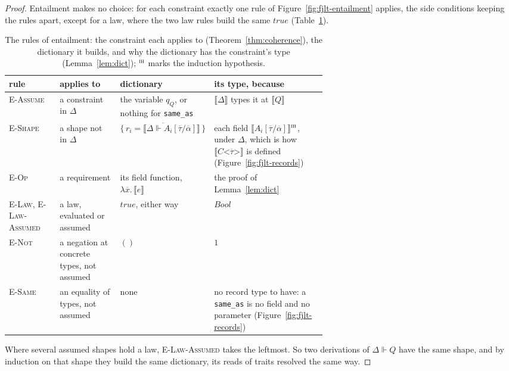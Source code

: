 \begin{proof}
Entailment makes no choice: for each constraint exactly one rule of Figure~\ref{fig:fjlt-entailment} applies, the side conditions keeping the rules apart, except for a law, where the two law rules build the same $\mathit{true}$ (Table~\ref{tab:entailment-cases}).
\begin{table}[htbp]
\centering
\small
\begin{tabularx}{\linewidth}{@{}>{\raggedright\arraybackslash}p{0.16\linewidth}>{\raggedright\arraybackslash}p{0.19\linewidth}>{\raggedright\arraybackslash}p{0.27\linewidth}>{\raggedright\arraybackslash}X@{}}
\toprule
rule & applies to & dictionary & its type, because \\
\midrule
\textsc{E-Assume} & a constraint in $\Delta$ & the variable $q_Q$, or nothing for \texttt{same\_as} & $\llbracket \Delta \rrbracket$ types it at $\llbracket Q \rrbracket$ \\
\textsc{E-Shape} & a shape not in $\Delta$ & $\{\,\overline{r_i = \llbracket \Delta \Vdash A_i[\overline{\tau}/\overline{\alpha}] \rrbracket}\,\}$ & each field $\llbracket A_i[\overline{\tau}/\overline{\alpha}] \rrbracket$${}^{\textsc{ih}}$, under $\Delta$, which is how $\llbracket C\texttt{<}\overline{\tau}\texttt{>} \rrbracket$ is defined (Figure~\ref{fig:fjlt-records}) \\
\textsc{E-Op} & a requirement & its field function, $\lambda\overline{x}.\,\llbracket e \rrbracket$ & the proof of Lemma~\ref{lem:dict} \\
\textsc{E-Law}, \textsc{E-Law-Assumed} & a law, evaluated or assumed & $\mathit{true}$, either way & $\mathit{Bool}$ \\
\textsc{E-Not} & a negation at concrete types, not assumed & $()$ & $1$ \\
\textsc{E-Same} & an equality of types, not assumed & none & no record type to have: a \texttt{same\_as} is no field and no parameter (Figure~\ref{fig:fjlt-records}) \\
\bottomrule
\end{tabularx}
\caption{The rules of entailment: the constraint each applies to (Theorem~\ref{thm:coherence}), the dictionary it builds, and why the dictionary has the constraint's type (Lemma~\ref{lem:dict}); ${}^{\textsc{ih}}$ marks the induction hypothesis.}
\label{tab:entailment-cases}
\end{table}
Where several assumed shapes hold a law, \textsc{E-Law-Assumed} takes the leftmost.
So two derivations of $\Delta \Vdash Q$ have the same shape, and by induction on that shape they build the same dictionary, its reads of traits resolved the same way.


\end{proof}
